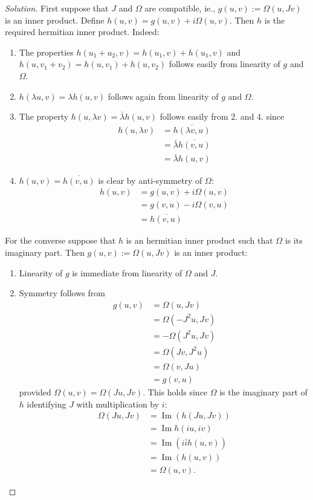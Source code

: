 \begin{proof}[Solution]\leavevmode
	First suppose that $J$ and $\Omega$ are compatible, ie., $g(u,v):=\Omega(u,Jv)$ is an inner product. Define $h(u,v)=g(u,v)+i\Omega(u,v)$. Then  $h$ is the required hermitian inner product. Indeed:

	\begin{enumerate}
		\item The properties $h(u_1+u_2,v)=h(u_1,v)+h(u_1,v)$ and  $h(u,v_1+v_2)=h(u,v_1)+h(u,v_2)$ follows easily from linearity of $g$ and $\Omega$.
		
		\item $h(\lambda u,v)=\lambda h(u,v)$ follows again from linearity of $g$ and $\Omega$.

		\item The property $h(u,\lambda v)=\bar{\lambda} h(u,v)$ follows easily from 2. and 4. since 
			\begin{align*}
				h(u,\lambda v)& =\overline{h(\lambda v, u)}\\
				& =\bar{\lambda} \overline{h(v,u)}\\
				& =\bar{\lambda} h(u,v)
			\end{align*}

		\item $h(u,v)=\overline{h(v,u)}$ is clear by anti-symmetry of $\Omega$:
			\begin{align*}
				h(u,v)& =g(u,v)+i\Omega(u,v)\\
				& =g(v,u)-i\Omega(v,u)\\
				& =\overline{h(v,u)}
			\end{align*}
	\end{enumerate}
	For the converse suppose that $h$ is an hermitian inner product such that $\Omega$ is its imaginary part. Then $g(u,v):=\Omega(u,Jv)$ is an inner product:
	\begin{enumerate}
		\item Linearity of $g$ is immediate from linearity of $\Omega$ and $J$.

		\item Symmetry follows from 
			 \begin{align*}
				g(u,v)&=\Omega(u,Jv)\\
				&=\Omega(-J^{2} u,Jv)\\
				& =-\Omega(J^{2} u,Jv)\\
				& =\Omega(Jv,J^{2} u)\\
				&=\Omega(v,Ju)\\
				&=g(v,u)
			\end{align*}
		provided $\Omega(u,v)=\Omega(Ju,Jv)$. This holds since $\Omega$ is the imaginary part of $h$ identifying $J$ with multiplication by $i$:
			\begin{align*}
				\Omega(Ju,Jv)&=\operatorname{Im}(h (Ju,Jv))\\
				& =\operatorname{Im}h(iu,iv)\\
				&=\operatorname{Im}(i\bar{i}h(u,v))\\
				&=\operatorname{Im}(h(u,v))\\
				&=\Omega(u,v).
			\end{align*}


\end{enumerate}
\end{proof}
